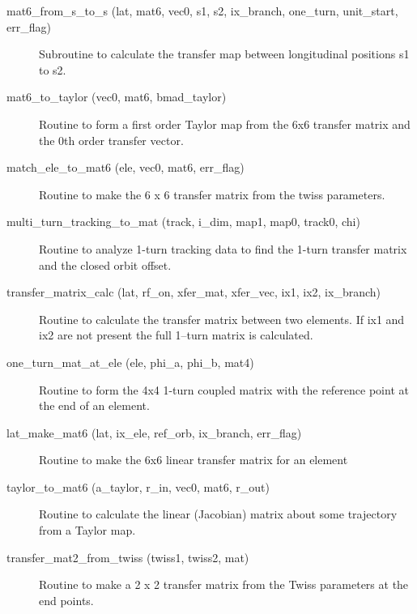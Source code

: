 \begin{description}
\label{r:mat6.from.s.to.s}
\item[mat6_from_s_to_s (lat, mat6, vec0, s1, s2, ix_branch, one_turn, unit_start, err_flag)] \Newline 
Subroutine to calculate the transfer map between longitudinal positions
s1 to s2.

\item[mat6_to_taylor (vec0, mat6, bmad_taylor)] \Newline
Routine to form a first order Taylor map from the 6x6 transfer matrix 
and the 0th order transfer vector. 

\label{r:match.ele.to.mat6}
\item[match_ele_to_mat6 (ele, vec0, mat6, err_flag)] \Newline 
Routine to make the 6 x 6 transfer matrix from the twiss parameters.

\item[multi_turn_tracking_to_mat (track, i_dim, map1, map0, track0, chi)] \Newline
Routine to analyze 1-turn tracking data to find the 1-turn transfer matrix 
and the closed orbit offset.

\label{r:transfer.matrix.calc}
\item[transfer_matrix_calc (lat, rf_on, xfer_mat, xfer_vec, ix1, ix2, ix_branch)] \Newline
Routine to calculate the transfer matrix between two elements. If
ix1 and ix2 are not present the full 1--turn matrix is calculated.

\label{r:one.turn.mat.at.ele}
\item[one_turn_mat_at_ele (ele, phi_a, phi_b, mat4)] \Newline
Routine to form the 4x4 1-turn coupled matrix with the reference point 
at the end of an element. 

\label{r:lat.make.mat6}
\item[lat_make_mat6 (lat, ix_ele, ref_orb, ix_branch, err_flag)] \Newline
Routine to make the 6x6 linear transfer matrix for an element 

\item[taylor_to_mat6 (a_taylor, r_in, vec0, mat6, r_out)] \Newline
Routine to calculate the linear (Jacobian) matrix about some trajectory from a Taylor map. 

\label{r:transfer.mat2.from.twiss}
\item[transfer_mat2_from_twiss (twiss1, twiss2, mat)] \Newline
Routine to make a 2 x 2 transfer matrix from the Twiss parameters at the end points. 


\end{description}
